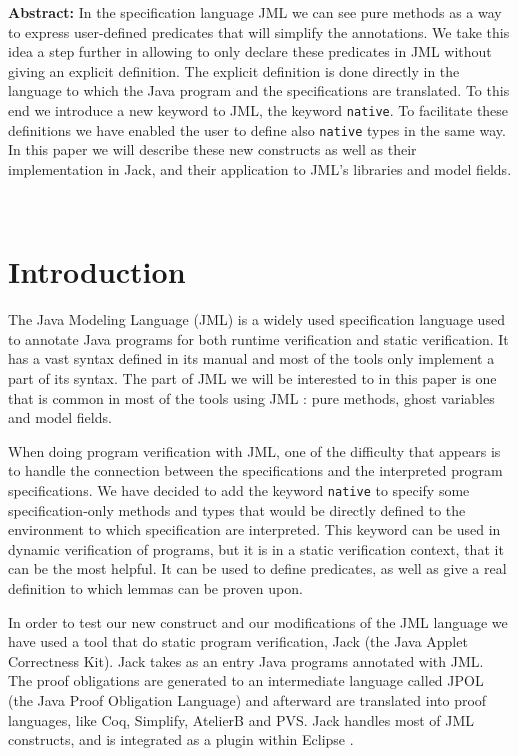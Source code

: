 \begin{center}
\begin{minipage}{12cm}
\begin{small}
{\bf Abstract:} In the specification language JML we can see pure methods as a way to 
express user-defined predicates that will simplify the annotations. 
We take this idea a step further in allowing 
to only declare these predicates in JML without giving an explicit definition.
The explicit definition is done directly in the language
to which the Java program and the specifications are 
translated. To this end we introduce a new keyword to JML, the keyword {\tt native}. 
To facilitate these definitions we have enabled the user to define 
also {\tt native} types in the same way.
In this paper we will describe these new constructs as well as their implementation in Jack, 
 and their application to JML's libraries and model fields.
\end{small}
\end{minipage}
\end{center}\ \\
\section{Introduction}
The Java Modeling Language (JML) is a widely used specification language used to annotate Java programs 
for both runtime verification and static verification. It has a vast syntax defined in its manual and most 
of the tools only implement a part of its syntax. The part of JML we will be interested to in this paper
is one that is common in most of the tools using JML \cite{BurdyEtAl05:STTT}: pure methods,  
ghost variables and  model fields. 

When doing program verification with JML, one of the difficulty that appears
is to handle the connection between the specifications and the interpreted program specifications.
We have decided to add the keyword {\tt native}
to specify some specification-only methods and types that would be directly defined to
the environment to which specification are interpreted. This keyword can be used in dynamic 
verification of programs, but it is in a static verification context, that it can be the most helpful.
It can be used to define predicates, as well as give a real definition to which lemmas can
be proven upon.

In order to test our new construct and our modifications of the JML language we have used
a tool that do static program verification,  Jack 
(the Java Applet Correctness Kit)\cite{BRL-03-JACK, Jack-Web}. 
Jack takes as an entry Java programs annotated with JML. 
The proof obligations are generated to an intermediate language called JPOL (the Java
Proof Obligation Language) and afterward are translated into proof languages, like Coq, Simplify, AtelierB 
and PVS. 
Jack handles most of JML constructs, and is integrated as a plugin within Eclipse \cite{Eclipse-Web}.

